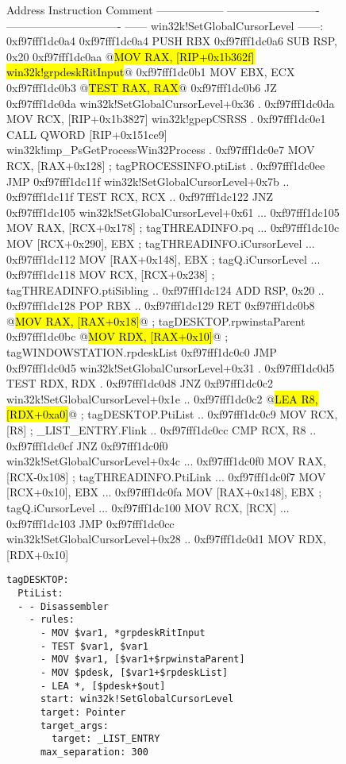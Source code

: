 \begin{figure}[tb]
\label{disassembly2}
\begin{assembly}
Address                     Instruction        Comment
------------------ ------------------------- -------------------------------
------ win32k!SetGlobalCursorLevel ------: 0xf97fff1dc0a4
 0xf97fff1dc0a4    PUSH RBX
 0xf97fff1dc0a6    SUB RSP, 0x20
 0xf97fff1dc0aa    @\hl{MOV RAX, [RIP+0x1b362f]   win32k!grpdeskRitInput}@
 0xf97fff1dc0b1    MOV EBX, ECX
 0xf97fff1dc0b3    @\hl{TEST RAX, RAX}@
 0xf97fff1dc0b6    JZ 0xf97fff1dc0da         win32k!SetGlobalCursorLevel+0x36
. 0xf97fff1dc0da   MOV RCX, [RIP+0x1b3827]   win32k!gpepCSRSS
. 0xf97fff1dc0e1   CALL QWORD [RIP+0x151ce9] win32k!imp_PsGetProcessWin32Process
. 0xf97fff1dc0e7   MOV RCX, [RAX+0x128]      ; tagPROCESSINFO.ptiList
. 0xf97fff1dc0ee   JMP 0xf97fff1dc11f        win32k!SetGlobalCursorLevel+0x7b
.. 0xf97fff1dc11f  TEST RCX, RCX
.. 0xf97fff1dc122  JNZ 0xf97fff1dc105        win32k!SetGlobalCursorLevel+0x61
... 0xf97fff1dc105 MOV RAX, [RCX+0x178]      ; tagTHREADINFO.pq
... 0xf97fff1dc10c MOV [RCX+0x290], EBX      ; tagTHREADINFO.iCursorLevel
... 0xf97fff1dc112 MOV [RAX+0x148], EBX      ; tagQ.iCursorLevel
... 0xf97fff1dc118 MOV RCX, [RCX+0x238]      ; tagTHREADINFO.ptiSibling
.. 0xf97fff1dc124  ADD RSP, 0x20
.. 0xf97fff1dc128  POP RBX
.. 0xf97fff1dc129  RET
 0xf97fff1dc0b8    @\hl{MOV RAX, [RAX+0x18]}@          ; tagDESKTOP.rpwinstaParent
 0xf97fff1dc0bc    @\hl{MOV RDX, [RAX+0x10]}@          ; tagWINDOWSTATION.rpdeskList
 0xf97fff1dc0c0    JMP 0xf97fff1dc0d5        win32k!SetGlobalCursorLevel+0x31
. 0xf97fff1dc0d5   TEST RDX, RDX
. 0xf97fff1dc0d8   JNZ 0xf97fff1dc0c2        win32k!SetGlobalCursorLevel+0x1e
.. 0xf97fff1dc0c2  @\hl{LEA R8, [RDX+0xa0]}@           ; tagDESKTOP.PtiList
.. 0xf97fff1dc0c9  MOV RCX, [R8]             ; _LIST_ENTRY.Flink
.. 0xf97fff1dc0cc  CMP RCX, R8
.. 0xf97fff1dc0cf  JNZ 0xf97fff1dc0f0        win32k!SetGlobalCursorLevel+0x4c
... 0xf97fff1dc0f0 MOV RAX, [RCX-0x108]      ; tagTHREADINFO.PtiLink
... 0xf97fff1dc0f7 MOV [RCX+0x10], EBX
... 0xf97fff1dc0fa MOV [RAX+0x148], EBX      ; tagQ.iCursorLevel
... 0xf97fff1dc100 MOV RCX, [RCX]
... 0xf97fff1dc103 JMP 0xf97fff1dc0cc        win32k!SetGlobalCursorLevel+0x28
.. 0xf97fff1dc0d1  MOV RDX, [RDX+0x10]
\end{assembly}

\begin{lstlisting}[basicstyle=\tiny\ttfamily, frame=single, linewidth=\columnwidth]
tagDESKTOP:
  PtiList:
  - - Disassembler
    - rules:
      - MOV $var1, *grpdeskRitInput
      - TEST $var1, $var1
      - MOV $var1, [$var1+$rpwinstaParent]
      - MOV $pdesk, [$var1+$rpdeskList]
      - LEA *, [$pdesk+$out]
      start: win32k!SetGlobalCursorLevel
      target: Pointer
      target_args:
        target: _LIST_ENTRY
      max_separation: 300
\end{lstlisting}


\end{figure}
